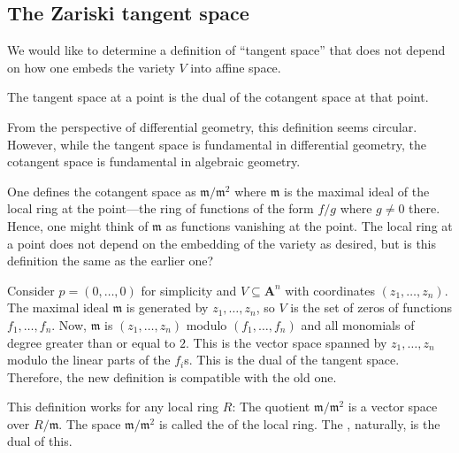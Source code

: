\documentclass [11 pt, oneside] {article}
\begin{document}
\subsection{The Zariski tangent space}
We would like to determine a definition of ``tangent space'' that does not depend on how one embeds the variety $V$ into affine space.

 \begin{definition}[ ]\label{}\text{}
The tangent space at a point is the dual of the cotangent space at that point.
\end{definition}

\begin{remark}
	From the perspective of differential geometry, this definition seems circular. However, while the tangent space is fundamental in differential geometry, the cotangent space is fundamental in algebraic geometry.
\end{remark}

One defines the cotangent space as $\mathfrak{m}/\mathfrak{m}^2$ where $\mathfrak{m}$ is the maximal ideal of the local ring at the point---the ring of functions of the form $f/g$ where $g\ne 0$ there. Hence, one might think of $\mathfrak{m}$ as functions vanishing at the point. The local ring at a point does not depend on the embedding of the variety as desired, but is this definition the same as the earlier one?

Consider $p= (0,\hdots, 0)$ for simplicity and $V\subseteq \mathbf{A}^n$ with coordinates $(z_1,\hdots, z_n)$. The maximal ideal $\mathfrak{m}$ is generated by $z_1,\hdots,z_n$, so $V$ is the set of zeros of functions $f_1,\hdots, f_n$. Now, $\mathfrak{m}$ is $(z_1,\hdots, z_n)$ modulo $(f_1,\hdots, f_n)$ and all monomials of degree greater than or equal to $2$. This is the vector space spanned by $z_1,\hdots, z_n$ modulo the linear parts of the $f_i$s. This is the dual of the tangent space. Therefore, the new definition is compatible with the old one.

\begin{remark}
	This definition works for any local ring $R$: The quotient $\mathfrak{m}/\mathfrak{m}^2$ is a vector space over $R/\mathfrak{m}$. The space $\mathfrak{m}/\mathfrak{m}^2$ is called the  of the local ring. The , naturally, is the dual of this.
\end{remark}
\end{document}
